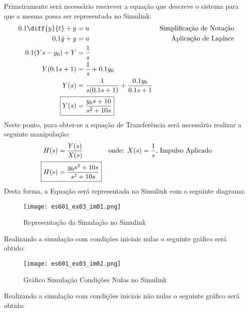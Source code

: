 \documentclass{article}
\begin{document}
            \begin{resolution}
                Primeiramente será necessário rescrever a equação que descreve o sistema para que a mesma possa ser representada no Simulink:
                    \begin{align}
                        0.1\diff{y}{t} + y    &= u & \text{Simplificação de Notação\nonumber}\\
                        0.1\dot{y} + y        &= u & \text{Aplicação de Laplace}\nonumber\\
                        0.1(Ys - y_{0}) + Y   &= \frac{1}{s}\nonumber\\
                        Y(0.1s + 1) &= \frac{1}{s} + 0.1 y_{0}\nonumber\\
                        Y(s) &= \frac{1}{s(0.1s + 1)} + \frac{0.1 y_{0}}{0.1s + 1} \label{eq:simulinkYsA}\\
                        \Aboxed{Y(s) &= \frac{y_{0}s + 10}{s^2 + 10s}}
                    \end{align}
                Neste ponto, para obter-se a equação de Transferência será necessário realizar a seguinte manipulação:
                    \begin{align}
                        H(s) &= \frac{Y(s)}{X(s)} & \text{onde: $X(s) = \frac{1}{s}$, Impulso Aplicado}\nonumber\\
                        \Aboxed{H(s) &= \frac{y_{0}s^2 + 10s}{s^2 + 10s}}
                    \end{align}
\newpage
                Desta forma, a Equação será representada no Simulink com o seguinte diagrama:
                    \begin{figure}[H]
                        \centering
                        \texttt{[image: es601\_ex03\_im01.png]}
                        \caption{Representação da Simulação no Simulink}
                    \end{figure}
                Realizando a simulação com condições iniciais nulas o seguinte gráfico será obtido:
                    \begin{figure}[H]
                        \centering
                        \texttt{[image: es601\_ex03\_im02.png]}
                        \caption{Gráfico Simulação Condições Nulas no Simulink}
                    \end{figure}
                Realizando a simulação com condições iniciais não nulas o seguinte gráfico será obtido:
                    \begin{figure}[H]

\end{figure}
\end{resolution}
\end{document}

